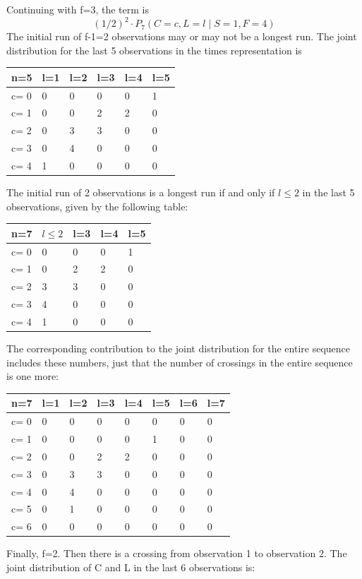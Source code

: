 Continuing with f=3, the term is $$(1/2)^2 \cdot   P_7 (C=c, L=l \mid S=1,F=4)$$
The initial run of f-1=2 observations may or may not be a longest run. The joint distribution for the last 5 observations in the times representation is 

\begin{tabular}{l | l l l l l}
\hline
n=5&l=1&l=2&l=3&l=4&l=5\\
\hline
c= 0& 0& 0& 0& 0& 1\\
c= 1& 0& 0& 2& 2& 0\\
c= 2& 0& 3& 3& 0& 0\\
c= 3& 0& 4& 0& 0& 0\\
c= 4& 1& 0& 0& 0& 0\\
\hline
\end{tabular}

The initial run of 2 observations is a longest run if and only if $l \leq 2$ in the last 5 observations, given by the following table:

\begin{tabular}{l | l l l l}
\hline
n=7&$l \leq 2$&l=3&l=4&l=5\\
\hline
c= 0& 0& 0& 0& 1\\
c= 1& 0& 2& 2& 0\\
c= 2& 3& 3& 0& 0\\
c= 3& 4& 0& 0& 0\\
c= 4& 1& 0& 0& 0\\
\hline
\end{tabular}

The corresponding contribution to the joint distribution for the entire sequence includes these numbers, just that the number of crossings in the entire sequence is one more:

\begin{tabular}{l | l l l l l l l}
\hline
n=7&l=1&l=2&l=3&l=4&l=5&l=6&l=7\\
\hline
c= 0& 0& 0& 0& 0& 0& 0& 0\\
c= 1& 0& 0& 0& 0& 1& 0& 0\\
c= 2& 0& 0& 2& 2& 0& 0& 0\\
c= 3& 0& 3& 3& 0& 0& 0& 0\\
c= 4& 0& 4& 0& 0& 0& 0& 0\\
c= 5& 0& 1& 0& 0& 0& 0& 0\\
c= 6& 0& 0& 0& 0& 0& 0& 0\\
\hline
\end{tabular}

Finally, f=2. Then there is a crossing from observation 1 to observation 2. The joint distribution of C and L in the last 6 observations is:

